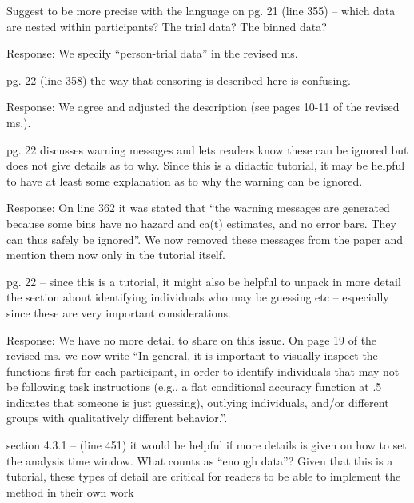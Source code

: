 \documentclass[
]{article}
\renewenvironment{quote}{\begin{leftbar}}{\end{leftbar}}
\begin{document}
\begin{quote}
Suggest to be more precise with the language on pg. 21 (line 355) --
which data are nested within participants? The trial data? The binned
data?
\end{quote}

Response: We specify ``person-trial data'' in the revised ms.

\begin{quote}
pg. 22 (line 358) the way that censoring is described here is confusing.
\end{quote}

Response: We agree and adjusted the description (see pages 10-11 of the
revised ms.).

\begin{quote}
pg. 22 discusses warning messages and lets readers know these can be
ignored but does not give details as to why. Since this is a didactic
tutorial, it may be helpful to have at least some explanation as to why
the warning can be ignored.
\end{quote}

Response: On line 362 it was stated that ``the warning messages are
generated because some bins have no hazard and ca(t) estimates, and no
error bars. They can thus safely be ignored''. We now removed these
messages from the paper and mention them now only in the tutorial
itself.

\begin{quote}
pg. 22 -- since this is a tutorial, it might also be helpful to unpack
in more detail the section about identifying individuals who may be
guessing etc -- especially since these are very important
considerations.
\end{quote}

Response: We have no more detail to share on this issue. On page 19 of
the revised ms. we now write ``In general, it is important to visually
inspect the functions first for each participant, in order to identify
individuals that may not be following task instructions (e.g., a flat
conditional accuracy function at .5 indicates that someone is just
guessing), outlying individuals, and/or different groups with
qualitatively different behavior.''.

\begin{quote}
section 4.3.1 -- (line 451) it would be helpful if more details is given
on how to set the analysis time window. What counts as ``enough data''?
Given that this is a tutorial, these types of detail are critical for
readers to be able to implement the method in their own work
\end{quote}
\end{document}
